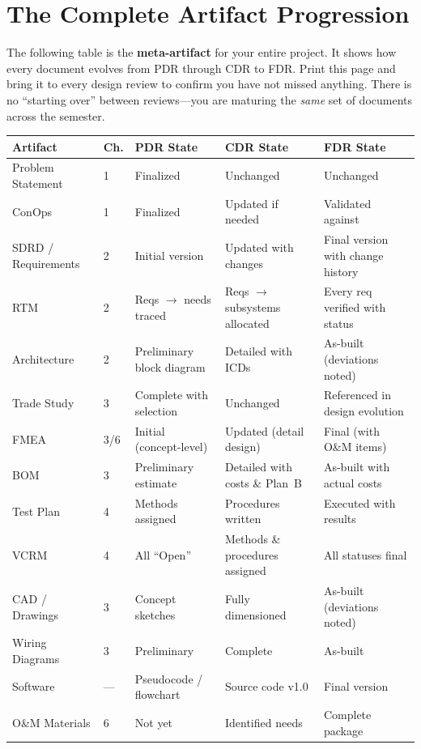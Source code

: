 \documentclass[11pt,letterpaper,twoside,openany]{book}
\begin{document}
\FloatBarrier
\section*{The Complete Artifact Progression}

The following table is the \textbf{meta-artifact} for your entire project. It shows how every document evolves from PDR through CDR to FDR. Print this page and bring it to every design review to confirm you have not missed anything. There is no ``starting over'' between reviews---you are maturing the \emph{same} set of documents across the semester.

\begin{center}
\small
\begin{tabularx}{\textwidth}{l l X X X}
\toprule
\textbf{Artifact} & \textbf{Ch.} & \textbf{PDR State} & \textbf{CDR State} & \textbf{FDR State} \\
\midrule
Problem Statement & 1 & Finalized & Unchanged & Unchanged \\
ConOps & 1 & Finalized & Updated if needed & Validated against \\
SDRD / Requirements & 2 & Initial version & Updated with changes & Final version with change history \\
RTM & 2 & Reqs $\to$ needs traced & Reqs $\to$ subsystems allocated & Every req verified with status \\
Architecture & 2 & Preliminary block diagram & Detailed with ICDs & As-built (deviations noted) \\
Trade Study & 3 & Complete with selection & Unchanged & Referenced in design evolution \\
FMEA & 3/6 & Initial (concept-level) & Updated (detail design) & Final (with O\&M items) \\
BOM & 3 & Preliminary estimate & Detailed with costs \& Plan~B & As-built with actual costs \\
Test Plan & 4 & Methods assigned & Procedures written & Executed with results \\
VCRM & 4 & All ``Open'' & Methods \& procedures assigned & All statuses final \\
CAD / Drawings & 3 & Concept sketches & Fully dimensioned & As-built (deviations noted) \\
Wiring Diagrams & 3 & Preliminary & Complete & As-built \\
Software & --- & Pseudocode / flowchart & Source code v1.0 & Final version \\
O\&M Materials & 6 & Not yet & Identified needs & Complete package \\
\bottomrule
\end{tabularx}
\end{center}
\end{document}
